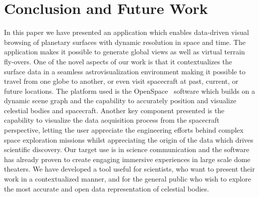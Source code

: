 \documentclass[journal]{vgtc}                %
\newcommand{\fig}[1]{Figure~\ref{fig:#1}}
\begin{document}


\section{Conclusion and Future Work} \label{sec:conclusion}
In this paper we have presented an application which enables data-driven visual browsing of planetary surfaces with dynamic resolution in space and time.
The application makes it possible to generate global views as well as virtual terrain fly-overs.
One of the novel aspects of our work is that it contextualizes the surface data in a seamless astrovisualization environment making it possible to travel from one globe to another, or even visit spacecraft at past, current, or future locations.
The platform used is the OpenSpace~\cite{Bock_2015} software which builds on a dynamic scene graph and the capability to accurately position and visualize celestial bodies and spacecraft.
Another key component presented is the capability to visualize the data acquisition process from the spacecraft perspective, letting the user appreciate the engineering efforts behind complex space exploration missions whilst appreciating the origin of the data which drives scientific discovery.
Our target use is in science communication and the software has already proven to create engaging immersive experiences in large scale dome theaters.
We have developed a tool useful for scientists, who want to present their work in a contextualized manner, and for the general public who wish to explore the most accurate and open data representation of celestial bodies.
\end{document}
